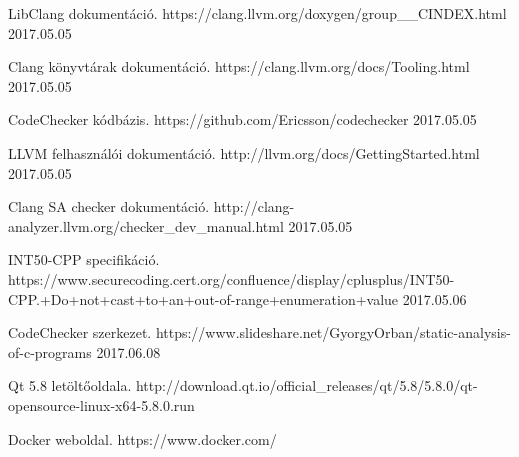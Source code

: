 \documentclass[a4paper,12pt]{report}
\begin{document}
\begin{thebibliography}{1}
 LibClang dokumentáció. https://clang.llvm.org/doxygen/group\_\_CINDEX.html 2017.05.05

 Clang könyvtárak dokumentáció. https://clang.llvm.org/docs/Tooling.html 2017.05.05

 CodeChecker kódbázis. https://github.com/Ericsson/codechecker 2017.05.05

 LLVM felhasználói dokumentáció. http://llvm.org/docs/GettingStarted.html 2017.05.05

 Clang SA checker dokumentáció. http://clang-analyzer.llvm.org/checker\_dev\_manual.html 2017.05.05

 INT50-CPP specifikáció. https://www.securecoding.cert.org/confluence/display/cplusplus/INT50-CPP.+Do+not+cast+to+an+out-of-range+enumeration+value 2017.05.06

 CodeChecker szerkezet. https://www.slideshare.net/GyorgyOrban/static-analysis-of-c-programs 2017.06.08

 Qt 5.8 letöltőoldala. http://download.qt.io/official\_releases/qt/5.8/5.8.0/qt-opensource-linux-x64-5.8.0.run

 Docker weboldal. https://www.docker.com/

\end{thebibliography}
\end{document}
